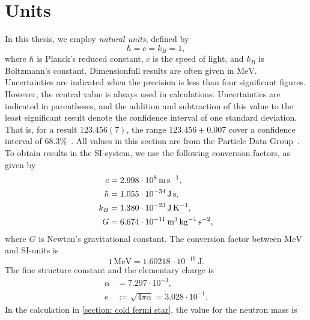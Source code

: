 \section{Units}
\label{section: units}


In this thesis, we employ \emph{natural units}, defined by
%
\begin{equation}
    \hbar = c = k_B = 1,
\end{equation}
%
where $\hbar$ is Planck's reduced constant, $c$ is the speed of light, and $k_B$ is Boltzmann's constant.
Dimensionfull results are often given in $\text{MeV}$.
Uncertainties are indicated when the precision is less than four significant figures. 
However, the central value is always used in calculations.
Uncertainties are indicated in parentheses, and the addition and subtraction of this value to the least significant result denote the confidence interval of one standard deviation.
That is, for a result $123.456(7)$, the range $123.456\pm0.007$ cover a confidence interval of $68.3\%$~\autocite{particledatagroupReviewParticlePhysics2020}.
All values in this section are from the Particle Data Group~\cite{particledatagroupReviewParticlePhysics2020}.
To obtain results in the SI-system, we use the following conversion factors, as given by
%
\begin{align}
    \label{speed of ligh}
    c       &= 2.998 \cdot 10^8     \, \text{m} \, \text{s}^{-1}, \\
    \label{hbar}
    \hbar   &= 1.055 \cdot 10^{-34} \, \text{J} \, \text{s}, \\
    \label{Boltzmanns constat}
    k_B     &= 1.380 \cdot 10^{-23} \, \text{J} \, \text K^{-1}, \\
    \label{Newtons gravitational constant}
    G       &= 6.674 \cdot 10^{-11} \, \text m^3 \, \text{kg}^{-1} \, \text s^{-2},
\end{align}
%
where $G$ is Newton's gravitational constant.
The conversion factor between $\text{MeV}$ and SI-units is
%
\begin{equation}
    \label{electronvolt}
    1 \, \text{MeV} = 1.60218\, \cdot 10^{-19} \, \text{J}. 
\end{equation}
%
The fine structure constant and the elementary charge is
%
\begin{align}
    \label{Fine structure constant}
    \alpha &= 7.297 \cdot 10^{-3}, \\
    \label{Elementary charge}
    e &:= \sqrt{4 \pi \alpha} =  3.028\cdot 10^{-1}.
\end{align}
%
In the calculation in \autoref{section: cold fermi star}, the value for the neutron mass is
